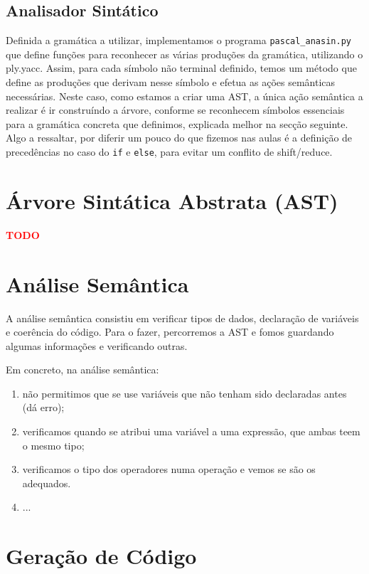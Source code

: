 \documentclass[12pt,a4paper]{report}
\begin{document}
\section{Analisador Sintático}
Definida a gramática a utilizar, implementamos o programa \texttt{pascal\_anasin.py} que define funções para reconhecer as várias produções da gramática, utilizando o ply.yacc.
Assim, para cada símbolo não terminal definido, temos um método que define as produções que derivam nesse símbolo e efetua as ações semânticas necessárias.
Neste caso, como estamos a criar uma AST, a única ação semântica a realizar é ir construíndo a árvore, conforme se reconhecem símbolos essenciais para a gramática concreta que definimos, explicada melhor na secção seguinte.
Algo a ressaltar, por diferir um pouco do que fizemos nas aulas é a definição de precedências no caso do \texttt{if} e \texttt{else}, para evitar um conflito de shift/reduce.

\chapter{Árvore Sintática Abstrata (AST)}

\textcolor{red}{\textbf{TODO}}

\chapter{Análise Semântica}

A análise semântica consistiu em verificar tipos de dados, declaração de variáveis e coerência do código. Para o fazer, percorremos a AST e fomos guardando algumas informações
e verificando outras.

Em concreto, na análise semântica:
\begin{enumerate}
    \item não permitimos que se use variáveis que não tenham sido declaradas antes (dá erro);
    \item verificamos quando se atribui uma variável a uma expressão, que ambas teem o mesmo tipo;
    \item verificamos o tipo dos operadores numa operação e vemos se são os adequados.
    \item ...
\end{enumerate}

\chapter{Geração de Código}
\end{document}

